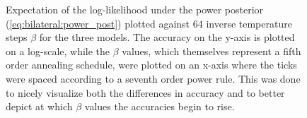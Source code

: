 \documentclass[\relativeRoot/main.tex]{subfiles}
\begin{document}
\begin{figure}
    \centering
    
    \caption{
        Expectation of the log-likelihood under the power posterior (\cref{eq:bilateral:power_post}) plotted against 64 inverse temperature steps $\beta$ for the three models. The accuracy on the y-axis is plotted on a log-scale, while the $\beta$ values, which themselves represent a fifth order annealing schedule, were plotted on an x-axis where the ticks were spaced according to a seventh order power rule. This was done to nicely visualize both the differences in accuracy and to better depict at which $\beta$ values the accuracies begin to rise.
    }
    \label{fig:bilateral:model_comp:thermo_int}
\end{figure}
\end{document}
